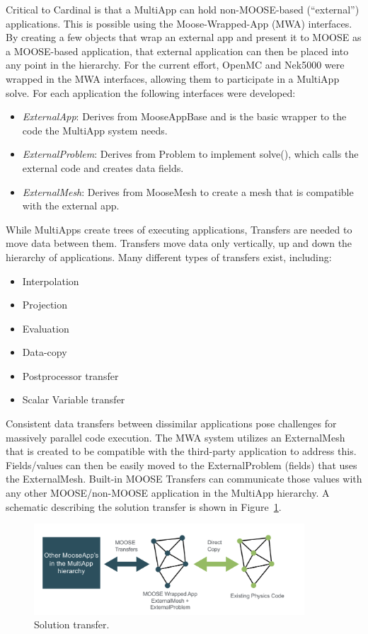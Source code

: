 Critical to Cardinal is that a MultiApp can hold non-MOOSE-based (``external'') applications. This is possible using the Moose-Wrapped-App (MWA) interfaces. By creating a few objects that wrap an external app and present it to MOOSE as a MOOSE-based application, that external application can then be placed into any point in the hierarchy. For the current effort, OpenMC and Nek5000 were wrapped in the MWA interfaces, allowing them to participate in a MultiApp solve. For each application the following interfaces were developed:
\begin{itemize}
    \item \textit{ExternalApp}: Derives from MooseAppBase and is the basic wrapper to the code the MultiApp
    system needs.
    \item \textit{ExternalProblem}: Derives from Problem to implement solve(), which calls the external code and creates data fields.
    \item \textit{ExternalMesh}: Derives from MooseMesh to create a mesh that is compatible with the external app.
\end{itemize}
While MultiApps create trees of executing applications, Transfers are needed to move data between them. Transfers move data only vertically, up and down the hierarchy of applications. Many different types of transfers exist, including:
\begin{itemize}
  \item Interpolation
  \item Projection
  \item Evaluation
  \item Data-copy
  \item Postprocessor transfer
  \item Scalar Variable transfer
\end{itemize}
Consistent data transfers between dissimilar applications pose challenges for massively parallel code execution.  The MWA system utilizes an ExternalMesh that is created to be compatible with the third-party application to address this. Fields/values can then be easily moved to the ExternalProblem (fields) that uses the ExternalMesh. Built-in MOOSE Transfers can communicate those values with any other MOOSE/non-MOOSE application in the MultiApp hierarchy. A schematic describing the solution transfer is shown in Figure~\ref{f:moose2}.

\begin{figure}[!h]
\centering
\includegraphics[clip=true,width=0.9\textwidth]{Figures/moose2}
\caption{Solution transfer.}
\label{f:moose2}
\end{figure}


